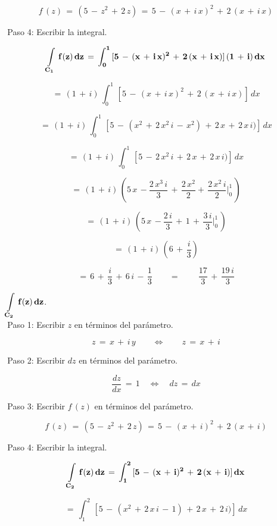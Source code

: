 \documentclass[a4paper,11pt,openany]{book}
\begin{document}
$$f\,(z)\,=\,(5\,-\,z^{2}\,+\,2\,z)\,=\,5\,-\,(x\,+\,i\,x)^{2}\,+\,2\,(x\,+\,i\,x)$$

\textcolor{ao(english)}{\,Paso 4:} Escribir la integral.

$$\bf{\displaystyle\int\limits_{C_{1}}\,f(z)\,dz}\,=\,\displaystyle\int_{0}^{1}\,[5\,-\,(x\,+\,i\,x)^{2}\,+\,2\,(x\,+\,i\,x)]\,(1\,+\,i)\,dx$$

$$=\,(1\,+\,i)\,\displaystyle\int_{0}^{1}\,[5\,-\,(x\,+\,i\,x)^{2}\,+\,2\,(x\,+\,i\,x)]\,dx$$

$$=\,(1\,+\,i)\,\displaystyle\int_{0}^{1}\,[5\,-\,(x^{2}\,+\,2\,x^{2}\,i\,-\,x^{2})\,+\,2\,x\,+\,2\,x\,i)]\,dx$$

$$=\,(1\,+\,i)\,\displaystyle\int_{0}^{1}\,[5\,-\,2\,x^{2}\,i\,+\,2\,x\,+\,2\,x\,i)]\,dx$$

$$=\,(1\,+\,i)\,\left(5\,x\,-\dfrac{2\,x^{3}\,i}{3}\,+\,\dfrac{2\,x^{2}}{2}+\,\dfrac{2\,x^{2}\,i}{2}\bigg|_{0}^{1}\,\right)$$

$$=\,(1\,+\,i)\,\left(5\,x\,-\dfrac{2\,i}{3}\,+\,1\,+\,\dfrac{3\,i}{3}\bigg|_{0}^{1}\,\right)$$

$$=\,(1\,+\,i)\,\left(6\,+\,\dfrac{i}{3}\right)$$

$$=\,6\,+\,\dfrac{i}{3}\,+\,6\,i\,-\,\dfrac{1}{3} \qquad=\qquad\,\dfrac{17}{3}\,+\,\dfrac{19\,i}{3}$$

$\bf{\displaystyle\int\limits_{C_{2}}\,f(z)\,dz}$.\\

\textcolor{ao(english)}{\,Paso 1:} Escribir $z$ en términos del parámetro.

$$z\,=\,x\,+\,i\,y \qquad\iff\qquad z\,=\,x\,+\,i$$

\textcolor{ao(english)}{\,Paso 2:} Escribir $dz$ en términos del parámetro.

$$\dfrac{dz}{dx}\,=\,1 \quad\iff\quad dz\,=\,dx$$

\textcolor{ao(english)}{\,Paso 3:} Escribir $f\,(z)$ en términos del parámetro.

$$f\,(z)\,=\,(5\,-\,z^{2}\,+\,2\,z)\,=\,5\,-\,(x\,+\,i)^{2}\,+\,2\,(x\,+\,i)$$

\textcolor{ao(english)}{\,Paso 4:} Escribir la integral.

$$\bf{\displaystyle\int\limits_{C_{2}}\,f(z)\,dz}\,=\,\displaystyle\int_{1}^{2}\,[5\,-\,(x\,+\,i)^{2}\,+\,2\,(x\,+\,i)]\,dx$$

$$=\,\displaystyle\int_{1}^{2}\,[5\,-\,(x^{2}\,+\,2\,x\,i\,-\,1)\,+\,2\,x\,+\,2\,i)]\,dx$$
\end{document}
